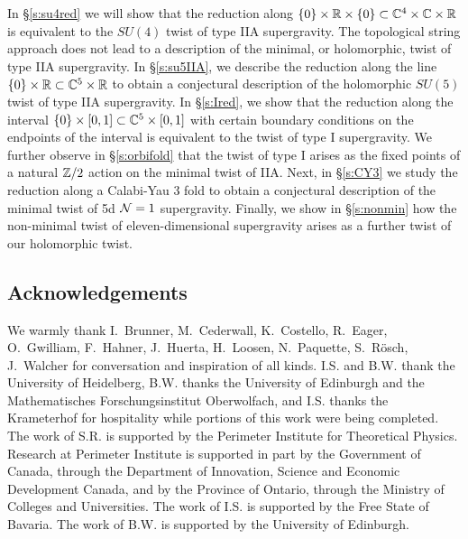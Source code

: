 In \S\ref{s:su4red} we will show that the reduction along $\{0\} \times \mathbb R \times \{0\} \subset \mathbb C^4 \times \mathbb C \times \mathbb R$ is equivalent to the $SU(4)$ twist of type IIA supergravity. 
The topological string approach does not lead to a description of the minimal, or holomorphic, twist of type IIA supergravity. 
In \S \ref{s:su5IIA}, we describe the reduction along the line $\{0\} \times \mathbb R \subset \mathbb C^5 \times \mathbb R$ to obtain a conjectural description of the holomorphic $SU(5)$ twist of type IIA supergravity. 
In \S \ref{s:Ired}, we show that the reduction along the interval $\{0\}\times [0,1]\subset \mathbb C^5\times [0,1]$ with certain boundary conditions on the endpoints of the interval is equivalent to the twist of type I supergravity. We further observe in \S \ref{s:orbifold} that the twist of type I arises as the fixed points of a natural $\mathbb Z/2$ action on the minimal twist of IIA. Next, in \S \ref{s:CY3} we study the reduction along a Calabi-Yau 3 fold to obtain a conjectural description of the minimal twist of 5d $\mathcal N=1$ supergravity. Finally, we show in \S \ref{s:nonmin} how the non-minimal twist of eleven-dimensional supergravity arises as a further twist of our holomorphic twist.



\subsection*{Acknowledgements}
We warmly thank I.~Brunner, M.~Cederwall, K.~Costello, R.~Eager, O.~Gwil\-liam, F.~Hahner, J.~Huerta, H.~Loosen, N.~Paquette, S.~R\"osch, J.~Walcher for conversation and inspiration of all kinds. I.S. and B.W. thank the University of Heidelberg, B.W. thanks the University of Edinburgh and the Mathematisches Forschungsinstitut Oberwolfach, and I.S. thanks the Krameterhof for hospitality while portions of this work were being completed. The work of S.R. is supported by the Perimeter Institute for Theoretical Physics. Research at Perimeter Institute is supported in part by the Government of Canada, through the Department of Innovation, Science and Economic Development Canada, and by the Province of Ontario, through the Ministry of Colleges and Universities.
The work of I.S. is supported by the Free State of Bavaria. The work of B.W. is supported by the University of Edinburgh.


%

